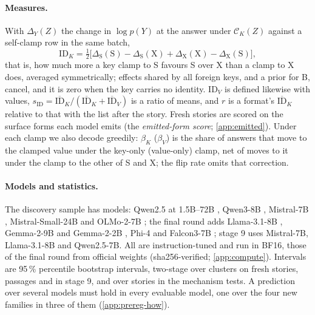\paragraph{Measures.}
With $\Delta_Y(Z)$ the change in $\log p(Y)$ at the answer under $\mathcal{C}_K(Z)$ against a self-clamp row in the same batch,
\begin{equation}\label{eq:idk}
\mathrm{ID}_K = \tfrac{1}{2}\big[\Delta_{\mathrm{S}}(\mathrm{S}) - \Delta_{\mathrm{S}}(\mathrm{X}) + \Delta_{\mathrm{X}}(\mathrm{X}) - \Delta_{\mathrm{X}}(\mathrm{S})\big],
\end{equation}
that is, how much more a key clamp to S favours S over X than a clamp to X does, averaged symmetrically; effects shared by all foreign keys, and a prior for B, cancel, and it is zero when the key carries no identity. $\mathrm{ID}_V$ is defined likewise with values, $s_{\mathrm{ID}} = \overline{\mathrm{ID}}_K/(\overline{\mathrm{ID}}_K + \overline{\mathrm{ID}}_V)$ is a ratio of means, and $r$ is a format's $\overline{\mathrm{ID}}_K$ relative to that with the list after the story. Fresh stories are scored on the surface forms each model emits (the \emph{emitted-form score}; \cref{app:emitted}). Under each clamp we also decode greedily: $\beta_K$ ($\beta_V$) is the share of answers that move to the clamped value under the key-only (value-only) clamp, net of moves to it under the clamp to the other of S and X; the flip rate omits that correction.

\paragraph{Models and statistics.}
The discovery sample has \nModels{} models: Qwen2.5 at 1.5B--72B \citep{yang2024qwen25}, Qwen3-8B \citep{yang2025qwen3}, Mistral-7B \citep{jiang2023mistral}, Mistral-Small-24B \citep{mistral2025small} and OLMo-2-7B \citep{olmo2025two}; the final round adds Llama-3.1-8B \citep{grattafiori2024llama3}, Gemma-2-9B and Gemma-2-2B \citep{gemma2024gemma2}, Phi-4 \citep{abdin2024phi4} and Falcon3-7B \citep{tii2024falcon3}; stage 9 uses Mistral-7B, Llama-3.1-8B and Qwen2.5-7B. All are instruction-tuned and run in BF16, those of the final round from official weights (sha256-verified; \cref{app:compute}). Intervals are 95\,\% percentile bootstrap intervals, two-stage over clusters on fresh stories, passages and in stage 9, and over stories in the mechanism tests. A prediction over several models must hold in every evaluable model, one over the four new families in three of them (\cref{app:prereg-how}).

